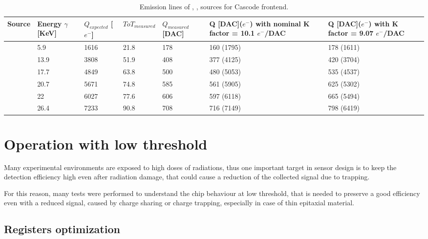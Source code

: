 \begin{table}[h!]
\centering
\begin{tabular}{C{1.2cm}|C{1.5cm}|C{1.5cm}|C{1.8cm}|C{1.6cm}|C{2.1cm}|C{2.1cm}}
\hline
Source & Energy $\gamma$ [KeV] & $Q_{expected}$ [$e^{-}$] & $ToT_{measured}$ & $Q_{measured}$ [DAC] & Q [DAC]($e^{-}$) \footnotesize{with nominal K factor = 10.1 $e^{-}$/DAC} & Q [DAC]($e^{-}$) \footnotesize{with  K factor = 9.07 $e^{-}$/DAC}\\[2ex]
\hline
\hline
{} & 5.9 & 1616 & 21.8 & 178 & 160 (1795) & 178 (1611) \\[0.5ex]
\hline
{} & 13.9 & 3808 & 51.9 & 408 & 377 (4125) & 420 (3704) \\[0.5ex]
\hline
{} & 17.7 & 4849 & 63.8 & 500 & 480 (5053) & 535 (4537) \\[0.5ex]
\hline
{} & 20.7 & 5671 & 74.8 & 585 & 561 (5905) & 625 (5302) \\[0.5ex]
\hline
{} & 22 & 6027 & 77.6 & 606 & 597 (6118) & 665 (5494) \\[0.5ex]
\hline
{} & 26.4 & 7233 & 90.8 & 708 & 716 (7149) & 798 (6419) \\[0.5ex]
\hline
\hline
\end{tabular}
\caption{Emission lines of , ,  sources for Cascode frontend.}
\label{tab:source_conv_casc}
\end{table}


\clearpage
\section{Operation with low threshold} \label{sec:low_thr}
 
Many experimental environments are exposed to high doses of radiations, thus one important target in sensor design is to keep the detection efficiency high even after radiation damage, that could cause a reduction of the collected signal due to trapping. 

For this reason, many tests were performed to understand the chip behaviour at low threshold, that is needed to preserve a good efficiency even with a reduced signal, caused by charge sharing or charge trapping, especially in case of thin epitaxial material.


\subsection{Registers optimization}\label{sec:currents}

